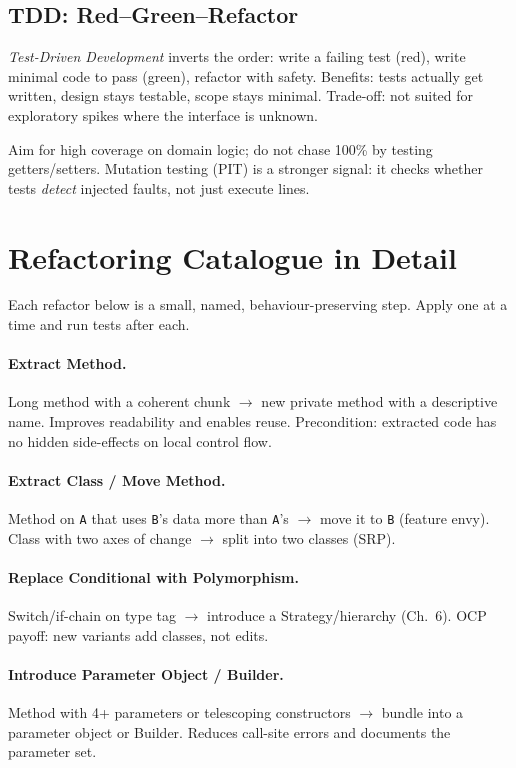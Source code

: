 \subsection{TDD: Red--Green--Refactor}
\emph{Test-Driven Development} inverts the order: write a failing test (red), write minimal code to pass (green), refactor with safety. Benefits: tests actually get written, design stays testable, scope stays minimal. Trade-off: not suited for exploratory spikes where the interface is unknown.

\begin{remark}
Aim for high coverage on domain logic; do not chase 100\% by testing getters/setters. Mutation testing (PIT) is a stronger signal: it checks whether tests \emph{detect} injected faults, not just execute lines.
\end{remark}

\section{Refactoring Catalogue in Detail}
\label{sec:refactoring-catalogue}
Each refactor below is a small, named, behaviour-preserving step. Apply one at a time and run tests after each.

\paragraph{Extract Method.} Long method with a coherent chunk $\to$ new private method with a descriptive name. Improves readability and enables reuse. Precondition: extracted code has no hidden side-effects on local control flow.

\paragraph{Extract Class / Move Method.} Method on \texttt{A} that uses \texttt{B}'s data more than \texttt{A}'s $\to$ move it to \texttt{B} (feature envy). Class with two axes of change $\to$ split into two classes (SRP).

\paragraph{Replace Conditional with Polymorphism.} Switch/if-chain on type tag $\to$ introduce a Strategy/hierarchy (Ch.~6). OCP payoff: new variants add classes, not edits.

\paragraph{Introduce Parameter Object / Builder.} Method with 4+ parameters or telescoping constructors $\to$ bundle into a parameter object or Builder. Reduces call-site errors and documents the parameter set.

